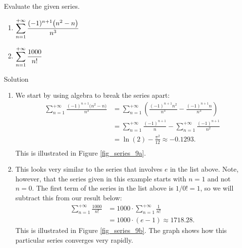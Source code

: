 \begin{example}\label{ex_series5}
Evaluate the given series.
\begin{multicols}{2}
\begin{enumerate}
\item $\displaystyle\sum_{n=1}^{+\infty} \frac{(-1)^{n+1}\big(n^2-n\big)}{n^3}$
\item $\displaystyle\sum_{n=1}^{+\infty} \frac{1000}{n!}$
\end{enumerate}
\end{multicols}

Solution 

\begin{enumerate}
\item	We start by using algebra to break the series apart:
\begin{align*}
\sum_{n=1}^{+\infty} \frac{(-1)^{n+1}\big(n^2-n\big)}{n^3} &= \sum_{n=1}^{+\infty}\left(\frac{(-1)^{n+1}n^2}{n^3}-\frac{(-1)^{n+1}n}{n^3}\right) \\[0.2cm]
						&= \sum_{n=1}^{+\infty}\frac{(-1)^{n+1}}{n}-\sum_{n=1}^{+\infty}\frac{(-1)^{n+1}}{n^2} \\[0.2cm]
						&= \ln(2) - \frac{\pi^2}{12}	\approx	-0.1293.\\[0.2cm]
\end{align*}
This is illustrated in Figure \ref{fig_series_9a}.

\item		This looks very similar to the series that involves $e$ in the list above. Note, however, that the series given in this example starts with $n=1$ and not $n=0$. The first term of the series in the list above is $1/0! = 1$, so we will subtract this from our result below:
\begin{align*}
		\sum_{n=1}^{+\infty} \frac{1000}{n!} &= 1000\cdot\sum_{n=1}^{+\infty} \frac{1}{n!} \\
							&= 1000\cdot (e-1) \approx  1718.28.
\end{align*}
This is illustrated in Figure \ref{fig_series_9b}. The graph shows how this particular series converges very rapidly.


\end{enumerate}
\end{example}
